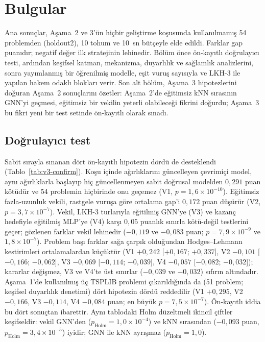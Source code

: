 \section{Bulgular}\label{sec:bulgular}

Ana sonuçlar, Aşama~2 ve 3'ün hiçbir geliştirme koşusunda kullanılmamış 54 problemden (holdout2),
10 tohum ve 10~sn bütçeyle elde edildi. Farklar gap puanıdır; negatif değer ilk stratejinin lehinedir.
Bölüm önce ön-kayıtlı doğrulayıcı testi, ardından keşifsel katman, mekanizma, duyarlılık ve
sağlamlık analizlerini, sonra yayımlanmış bir öğrenilmiş modelle, eşit vuruş sayısıyla ve LKH-3 ile
yapılan hakem odaklı blokları verir. Son alt bölüm, Aşama~3 hipotezlerini doğuran Aşama~2 sonuçlarını
özetler: Aşama~2'de eğitimsiz kNN sırasının GNN'yi geçmesi, eğitimsiz bir vekilin yeterli olabileceği
fikrini doğurdu; Aşama~3 bu fikri yeni bir test setinde ön-kayıtlı olarak sınadı.

\subsection{Doğrulayıcı test}\label{sec:bulgular-dogrulayici}

Sabit sırayla sınanan dört ön-kayıtlı hipotezin dördü de desteklendi
(Tablo~\ref{tab:v3-confirm}). Koşu içinde ağırlıklarını güncelleyen çevrimiçi model, aynı ağırlıklarla
başlayıp hiç güncellenmeyen sabit doğrusal modelden $0{,}291$ puan kötüdür ve 54 problemin hiçbirinde
onu geçemez (V1, $p=1{,}6\times10^{-10}$).
Eğitimsiz fazla-uzunluk vekili, rastgele vuruşa göre ortalama gap'i $0{,}172$ puan düşürür
(V2, $p=3{,}7\times10^{-7}$).
Vekil, LKH-3 turlarıyla eğitilmiş GNN'ye (V3) ve kazanç hedefiyle eğitilmiş MLP'ye (V4) karşı
$0{,}05$ puanlık sınırla kötü-değil testlerini geçer; gözlenen farklar vekil lehinedir ($-0{,}119$
ve $-0{,}083$ puan; $p=7{,}9\times10^{-9}$ ve $1{,}8\times10^{-7}$).
Problem başı farklar sağa çarpık olduğundan Hodges--Lehmann kestirimleri ortalamalardan küçüktür
(V1 $+0{,}242$ [$+0{,}167$; $+0{,}337$], V2 $-0{,}101$ [$-0{,}166$; $-0{,}062$], V3 $-0{,}069$
[$-0{,}114$; $-0{,}039$], V4 $-0{,}057$ [$-0{,}082$; $-0{,}032$]); kararlar değişmez, V3
ve V4'te üst sınırlar ($-0{,}039$ ve $-0{,}032$) sıfırın altındadır.
Aşama~1'de kullanılmış üç TSPLIB problemi çıkarıldığında da (51 problem; keşifsel duyarlılık
denetimi) dört hipotezin dördü reddedilir (V1 $+0{,}295$, V2 $-0{,}166$, V3 $-0{,}114$, V4 $-0{,}084$
puan; en büyük $p=7{,}5\times10^{-7}$).
Ön-kayıtlı iddia bu dört sonuçtan ibarettir. Aynı tablodaki Holm düzeltmeli ikincil çiftler
keşifseldir: vekil GNN'den ($p_{\mathrm{Holm}}=1{,}0\times10^{-4}$) ve kNN sırasından ($-0{,}093$ puan,
$p_{\mathrm{Holm}}=3{,}4\times10^{-5}$) iyidir; GNN ile kNN ayrışmaz ($p_{\mathrm{Holm}}=1{,}0$).

